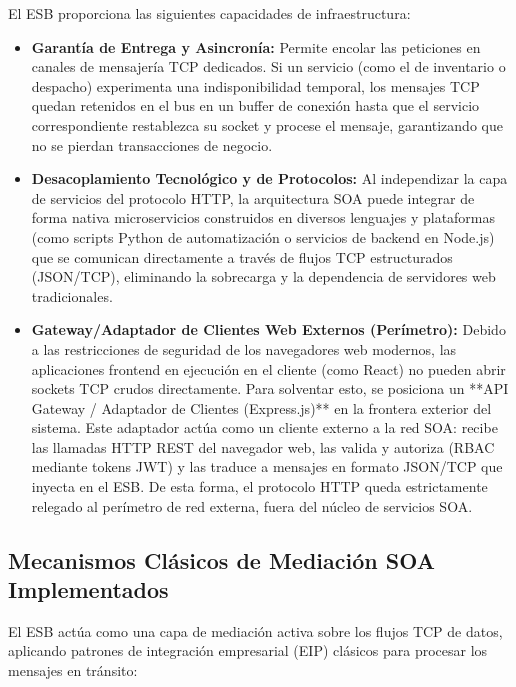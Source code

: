 \documentclass[12pt,a4paper]{article}
\begin{document}
El ESB proporciona las siguientes capacidades de infraestructura:
\begin{itemize}
    \item \textbf{Garantía de Entrega y Asincronía:} Permite encolar las peticiones en canales de mensajería TCP dedicados. Si un servicio (como el de inventario o despacho) experimenta una indisponibilidad temporal, los mensajes TCP quedan retenidos en el bus en un buffer de conexión hasta que el servicio correspondiente restablezca su socket y procese el mensaje, garantizando que no se pierdan transacciones de negocio.
    \item \textbf{Desacoplamiento Tecnológico y de Protocolos:} Al independizar la capa de servicios del protocolo HTTP, la arquitectura SOA puede integrar de forma nativa microservicios construidos en diversos lenguajes y plataformas (como scripts Python de automatización o servicios de backend en Node.js) que se comunican directamente a través de flujos TCP estructurados (JSON/TCP), eliminando la sobrecarga y la dependencia de servidores web tradicionales.
    \item \textbf{Gateway/Adaptador de Clientes Web Externos (Perímetro):} Debido a las restricciones de seguridad de los navegadores web modernos, las aplicaciones frontend en ejecución en el cliente (como React) no pueden abrir sockets TCP crudos directamente. Para solventar esto, se posiciona un **API Gateway / Adaptador de Clientes (Express.js)** en la frontera exterior del sistema. Este adaptador actúa como un cliente externo a la red SOA: recibe las llamadas HTTP REST del navegador web, las valida y autoriza (RBAC mediante tokens JWT) y las traduce a mensajes en formato JSON/TCP que inyecta en el ESB. De esta forma, el protocolo HTTP queda estrictamente relegado al perímetro de red externa, fuera del núcleo de servicios SOA.
\end{itemize}

\subsection{Mecanismos Clásicos de Mediación SOA Implementados}
El ESB actúa como una capa de mediación activa sobre los flujos TCP de datos, aplicando patrones de integración empresarial (EIP) clásicos para procesar los mensajes en tránsito:
\end{document}
